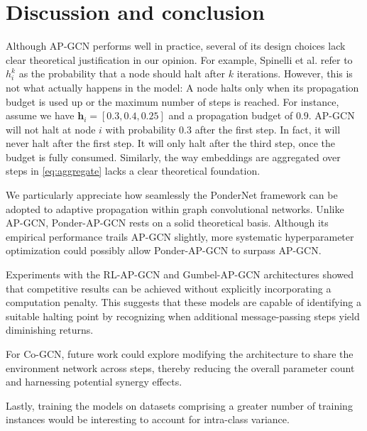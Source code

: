 \documentclass{gdl}
\begin{document}
\section{Discussion and conclusion}
Although AP-GCN performs well in practice, several of its design choices lack clear theoretical justification in our opinion. For example, Spinelli et al. refer to $h_i^k$ as the probability that a node should halt after $k$ iterations. However, this is not what actually happens in the model: A node halts only when its propagation budget is used up or the maximum number of steps is reached. For instance, assume we have $\mathbf{h}_i = [0.3, 0.4, 0.25]$ and a propagation budget of $0.9$. AP-GCN will not halt at node $i$ with probability $0.3$ after the first step. In fact, it will never halt after the first step. It will only halt after the third step, once the budget is fully consumed. Similarly, the way embeddings are aggregated over steps in \autoref{eq:aggregate} lacks a clear theoretical foundation.

We particularly appreciate how seamlessly the PonderNet framework can be adopted to adaptive propagation within graph convolutional networks. Unlike AP-GCN, Ponder-AP-GCN rests on a solid theoretical basis. Although its empirical performance trails AP-GCN slightly, more systematic hyperparameter optimization could possibly allow Ponder-AP-GCN to surpass AP-GCN.

Experiments with the RL-AP-GCN and Gumbel-AP-GCN architectures showed that competitive results can be achieved without explicitly incorporating a computation penalty. This suggests that these models are capable of identifying a suitable halting point by recognizing when additional message-passing steps yield diminishing returns.

For Co-GCN, future work could explore modifying the architecture to share the environment network across steps, thereby reducing the overall parameter count and harnessing potential synergy effects.

Lastly, training the models on datasets comprising a greater number of training instances would be interesting to account for intra-class variance.
\end{document}
